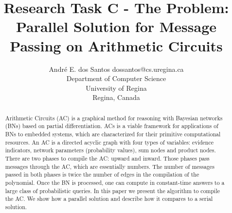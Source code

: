 \documentclass[twoside,11pt]{article}
\begin{document}
\title{Research Task C - The Problem: \\ Parallel Solution for Message Passing on Arithmetic Circuits}

\author{\name Andr\'e E. dos Santos \email dossantos@cs.uregina.ca \\
\addr Department of Computer Science \\
University of Regina \\ 
Regina, Canada
}



\maketitle

\begin{abstract}%
Arithmetic Circuits (AC) is a graphical method for reasoning with Bayesian networks (BNs) based on partial differentiation.
ACs is a viable framework for applications of BNs to embedded systems, which are characterized for their primitive computational resources. 
An AC is a directed acyclic graph with four types of variables: evidence indicators, network parameters (probability values), sum nodes and product nodes.
There are two phases to compile the AC: upward and inward.
Those phases pass messages through the AC, which are essentially numbers.
The number of messages passed in both phases is twice the number of edges in the compilation of the polynomial.
Once the BN is processed, one can compute in constant-time answers to a large class of probabilistic queries.
In this paper we present the algorithm to compile the AC.
We show how a parallel solution and describe how it compares to a serial solution.
%
%
%
\end{abstract}
\end{document}
